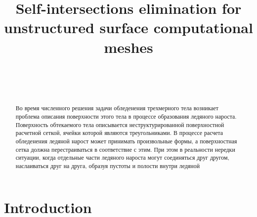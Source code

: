 \documentclass[
11pt,%
tightenlines,%
twoside,%
onecolumn,%
nofloats,%
nobibnotes,%
nofootinbib,%
superscriptaddress,%
noshowpacs,%
centertags]%
{revtex4}
\begin{document}

\title{Self-intersections elimination for unstructured surface computational meshes}

\author{~}

\author{~}



\begin{abstract}
Во время численного решения задачи обледенения трехмерного тела возникает проблема описания поверхности этого тела в процессе образования ледяного нароста.
Поверхность обтекаемого тела описывается неструктурированной поверхностной расчетной сеткой, ячейки которой являются треугольниками.
В процессе расчета обледенения ледяной нарост может принимать произвольные формы, а поверхностная сетка должна перестраиваться в соответствие с этим.
При этом в реальности нередки ситуации, когда отдельные части ледяного нароста могут соединяться друг другом, наслаиваться друг на друга, образуя пустоты и полости внутри ледяной 
\end{abstract}



\maketitle

\section{Introduction}
\end{document}
